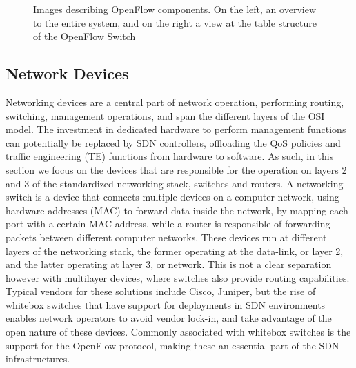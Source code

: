 \begin {enumerate}
\begin{figure} [h]
    \centering
    \begin{subfigure}
    \texttt{[image: sdn/open\_flow\_switch\_pipeline]}
    \end{subfigure}
    \begin{subfigure}
    \texttt{[image: sdn/open\_flow\_tables]}
    \end{subfigure}
    \caption{Images describing OpenFlow components. On the left, an overview to the entire system, and on the right a view at the table structure of the 
    OpenFlow Switch \cite{open_networking_foundation_openflow_2015}}
\end{figure}

\subsection {Network Devices}

Networking devices are a central part of network operation, performing routing, switching, management operations, and span the different layers of the OSI model. 
The investment in dedicated hardware to perform management functions can potentially be replaced by SDN controllers, offloading the QoS policies and traffic
engineering (TE) functions from hardware to software. As such, in this section we focus on the devices that are responsible for the operation on layers 2 and 3 of
the standardized networking stack, switches and routers. A networking switch is a device that connects multiple devices on a computer network, using hardware
addresses (MAC) to forward data inside the network, by mapping each port with a certain MAC address, while a router is responsible of forwarding packets between
different computer networks. These devices run at different layers of the networking stack, the former operating at the data-link, or layer 2, and the latter
operating at layer 3, or network. This is not a clear separation however with multilayer devices, where switches also provide routing capabilities. Typical vendors
for these solutions include Cisco, Juniper, but the rise of whitebox switches that have support for deployments in SDN environments enables network operators to
avoid vendor lock-in, and take advantage of the open nature of these devices. Commonly associated with whitebox switches is the support for the OpenFlow protocol,
making these an essential part of the SDN infrastructures.


\end{enumerate}
